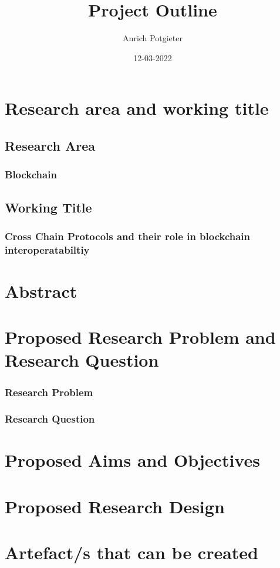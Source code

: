 \documentclass[12pt]{article}
\title{Project Outline}
\author{Anrich Potgieter}
\date{12-03-2022}
\begin{document}
\maketitle
\tableofcontents

\section{Research area and working title}
\subsection{Research Area}
\subsubsection{Blockchain}

\subsection{Working Title}
\subsubsection{Cross Chain Protocols and their role in blockchain interoperatabiltiy}

\section{Abstract}

\section{Proposed Research Problem and Research Question}
\subsubsection{Research Problem}
\subsubsection{Research Question}

\section{Proposed Aims and Objectives}
\section{Proposed Research Design}
\section{Artefact/s that can be created}

\printbibliography
\end{document}
